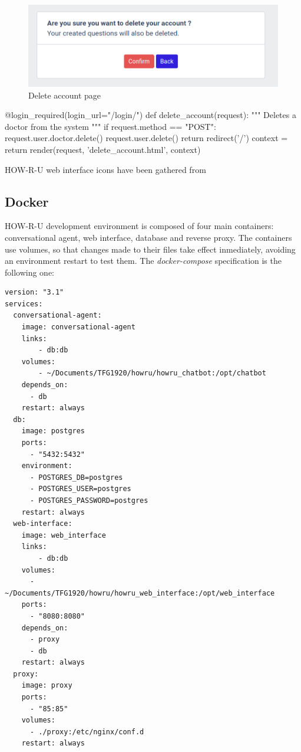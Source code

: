 \documentclass[12pt,english]{article}
\begin{document}
\begin{figure}[H]
    \centering
    \includegraphics[width=\textwidth]{delete_account.png}
    \caption{Delete account page}
\end{figure}


\begin{python}[caption={Method to delete an account}, captionpos=b]
@login_required(login_url="/login/")
def delete_account(request):
    """
    Deletes a doctor from the system
    """
    if request.method == "POST":
        request.user.doctor.delete()
        request.user.delete()
        return redirect('/')
    context = {}
    return render(request, 'delete_account.html', context)
\end{python}

HOW-R-U web interface icons have been gathered from \cite{pixabay}
\newpage
\subsection{Docker}

HOW-R-U development environment is composed of four main containers: conversational agent, web interface, database and reverse proxy. The containers use volumes, so that changes made to their files take effect inmediately, avoiding an environment restart to test them. The \emph{docker-compose} specification is the following one:

\begin{lstlisting}[language=docker-compose-2, caption={HOW-R-U docker-compose file}, captionpos=b]
version: "3.1"
services:
  conversational-agent:
    image: conversational-agent
    links:
        - db:db
    volumes:
        - ~/Documents/TFG1920/howru/howru_chatbot:/opt/chatbot
    depends_on:
      - db
    restart: always
  db:
    image: postgres
    ports:
      - "5432:5432"
    environment:
      - POSTGRES_DB=postgres
      - POSTGRES_USER=postgres
      - POSTGRES_PASSWORD=postgres
    restart: always
  web-interface:
    image: web_interface
    links:
        - db:db
    volumes:
      - ~/Documents/TFG1920/howru/howru_web_interface:/opt/web_interface
    ports:
      - "8080:8080"
    depends_on:
      - proxy
      - db
    restart: always
  proxy:
    image: proxy
    ports:
      - "85:85"
    volumes:
      - ./proxy:/etc/nginx/conf.d
    restart: always
\end{lstlisting}
\end{document}
